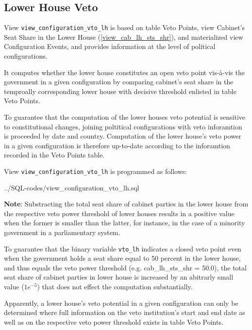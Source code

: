 \subsection{Lower House Veto}\label{view_configuration_vto_lh}
View \texttt{\footnotesize view\_configuration\_vto\_lh} is based on table Veto Points, view Cabinet's Seat Share in the Lower House (\ref{view_cab_lh_sts_shr}), and materialized view Configuration Events, and provides information at the level of political configurations.

It computes whether the lower house constitutes an open veto point vis-\`a-vis the government in a given configuration by comparing cabinet's seat share in the temproally corresponding lower house with decisive threshold enlisted in table Veto Points. 

To guarantee that the computation of the lower houses veto potential is sensitive to constitutional changes, joining poltitical configurations with veto inforamtion is proceeded by date and country. 
Computation of the lower house's veto power in a given configuration is therefore up-to-date according to the inforamtion recorded in the Veto Points table.

View \texttt{\footnotesize view\_configuration\_vto\_lh} is programmed as follows:

%
{../SQL-codes/view_configuration_vto_lh.sql}



{\bf Note}: 	Substracting the total seat share of cabinet parties in the lower house from the respective veto power threshold of lower houses results in a positive value when the former is smaller than the latter, for instance, in the case of a minority government in a parliamentary system.

To guarantee that the binary variable \texttt{\footnotesize vto\_lh} indicates a closed veto point even when the  government holds a seat share equal to 50 percent in the lower house, and thus equals the veto power threshold (e.g. cab\_lh\_sts\_shr = 50.0), the total seat share of cabinet parties in lower house is increased by an abitrarly small value ($1e^{-5}$) that does not effect the computation substantially.

Apparently, a lower house's veto potential in a given configuration can only be determined where full information on the veto institution's start and end date as well as on the respective veto power threshold exists in table Veto Points. 
